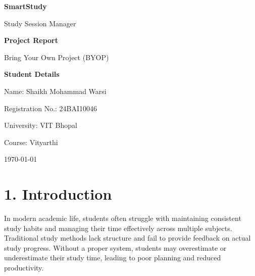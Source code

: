\documentclass[12pt,a4paper]{article}
\begin{document}
\begin{titlepage}
    \centering
    \vspace*{2cm}

    {\LARGE\bfseries SmartStudy\par}
    \vspace{0.5cm}
    {\large Study Session Manager\par}
    \vspace{2cm}

    {\Large\bfseries Project Report\par}
    \vspace{2cm}

    {\large Bring Your Own Project (BYOP)\par}
    \vspace{1cm}

    \textbf{Student Details}\par
    \vspace{0.5cm}
    {\large Name: Shaikh Mohammad Warsi\par}
    {\large Registration No.: 24BAI10046\par}
    {\large University: VIT Bhopal\par}
    {\large Course: Vityarthi\par}
    \vspace{2cm}

    \today

    \vspace{3cm}

    \begin{abstract}
        This report presents SmartStudy, a JavaFX-based desktop application designed to help students manage their study sessions using the Pomodoro technique. The application provides a customizable study timer, tracks completed sessions, and offers analytics on study habits with personalized recommendations.
    \end{abstract}

\end{titlepage}

\tableofcontents
\newpage

\section{1. Introduction}

In modern academic life, students often struggle with maintaining consistent study habits and managing their time effectively across multiple subjects. Traditional study methods lack structure and fail to provide feedback on actual study progress. Without a proper system, students may overestimate or underestimate their study time, leading to poor planning and reduced productivity.
\end{document}
